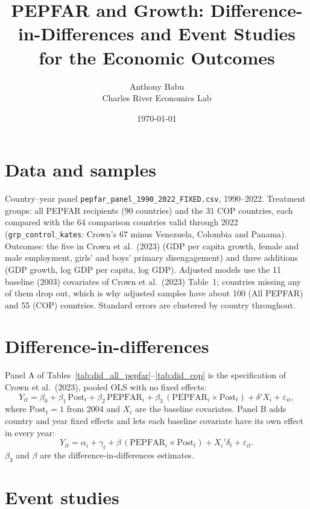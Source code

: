 \documentclass[11pt]{article}
\title{PEPFAR and Growth: Difference-in-Differences and Event Studies\\for the Economic Outcomes}
\author{Anthony Babu\\Charles River Economics Lab}
\date{\today}
\begin{document}
\maketitle

\section*{Data and samples}

Country--year panel \texttt{pepfar\_panel\_1990\_2022\_FIXED.csv}, 1990--2022. Treatment
groups: all PEPFAR recipients (90 countries) and the 31 COP countries, each compared with
the 64 comparison countries valid through 2022 (\texttt{grp\_control\_kates}: Crown's 67
minus Venezuela, Colombia and Panama). Outcomes: the five in Crown et al.\ (2023) (GDP per
capita growth, female and male employment, girls' and boys' primary disengagement) and
three additions (GDP growth, log GDP per capita, log GDP). Adjusted models use the 11
baseline (2003) covariates of Crown et al.\ (2023) Table~1; countries missing any of them
drop out, which is why adjusted samples have about 100 (All PEPFAR) and 55 (COP) countries.
Standard errors are clustered by country throughout.

\section{Difference-in-differences}

Panel A of Tables~\ref{tab:did_all_pepfar}--\ref{tab:did_cop} is the specification of Crown
et al.\ (2023), pooled OLS with no fixed effects:
\begin{equation*}
Y_{it} = \beta_0 + \beta_1\,\text{Post}_t + \beta_2\,\text{PEPFAR}_i
       + \beta_3\,(\text{PEPFAR}_i \times \text{Post}_t) + \delta' X_i + \varepsilon_{it},
\end{equation*}
where $\text{Post}_t = 1$ from 2004 and $X_i$ are the baseline covariates. Panel B adds
country and year fixed effects and lets each baseline covariate have its own effect in
every year:
\begin{equation*}
Y_{it} = \alpha_i + \gamma_t + \beta\,(\text{PEPFAR}_i \times \text{Post}_t)
       + X_i' \delta_t + \varepsilon_{it}.
\end{equation*}
$\beta_3$ and $\beta$ are the difference-in-differences estimates.




\clearpage

\section{Event studies}
\end{document}
